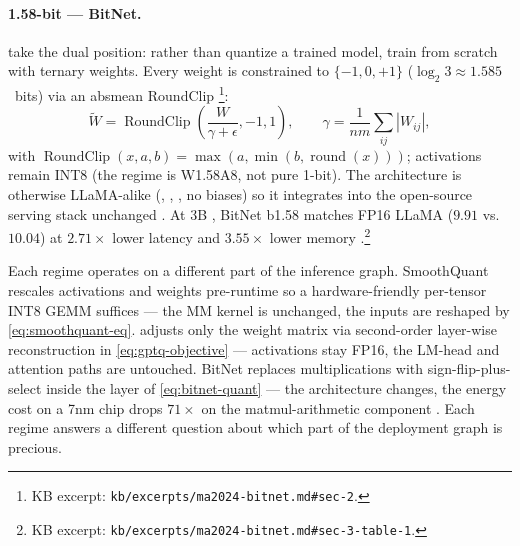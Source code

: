 \paragraph{1.58-bit --- BitNet.}
\citet{ma2024-bitnet} take the dual position: rather than quantize a
trained model, train from scratch with ternary weights. Every weight
is constrained to $\{-1, 0, +1\}$ ($\log_2 3 \approx 1.585$~bits) via
an absmean RoundClip \citep[\S 2, Eq.~1--3]{ma2024-bitnet}\footnote{KB
excerpt: \texttt{kb/excerpts/ma2024-bitnet.md\#sec-2}.}:
\begin{equation}
\widetilde{W} = \operatorname{RoundClip}\!\left(\frac{W}{\gamma + \epsilon}, -1, 1\right),
\qquad
\gamma = \frac{1}{nm} \sum_{ij} |W_{ij}|,
\label{eq:bitnet-quant}
\end{equation}
with $\operatorname{RoundClip}(x, a, b) = \max(a, \min(b, \operatorname{round}(x)))$;
activations remain INT8 (the regime is W1.58A8, not pure 1-bit). The
architecture is otherwise LLaMA-alike (, , , no
biases) so it integrates into the open-source serving stack
unchanged \citep[\S 2]{ma2024-bitnet}. At 3B ,
BitNet b1.58 matches FP16 LLaMA  ($9.91$ vs.\ $10.04$) at
$2.71\times$ lower latency and $3.55\times$ lower memory
\citep[\S 3, Table~1]{ma2024-bitnet}.\footnote{KB excerpt:
\texttt{kb/excerpts/ma2024-bitnet.md\#sec-3-table-1}.}

\begin{intuition}
Each regime operates on a different part of the inference graph.
SmoothQuant rescales activations and weights pre-runtime so a
hardware-friendly per-tensor INT8 GEMM suffices --- the MM kernel is
unchanged, the inputs are reshaped by \cref{eq:smoothquant-eq}. 
adjusts only the weight matrix via second-order layer-wise
reconstruction in \cref{eq:gptq-objective} --- activations stay FP16,
the LM-head and attention paths are untouched. BitNet replaces
multiplications with sign-flip-plus-select inside the  layer
of \cref{eq:bitnet-quant} --- the architecture changes, the energy
cost on a 7nm chip drops $71\times$ on the matmul-arithmetic
component \citep[\S 3]{ma2024-bitnet}. Each regime answers a different
question about which part of the deployment graph is precious.
\end{intuition}

